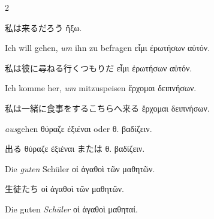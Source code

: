 \begin{paracol}{2}
\begin{enumerate}[leftmargin=0pt,rightmargin=0pt,listparindent =1cm,labelindent=1cm,labelsep=1ex,labelwidth={*},itemindent={*},align=left]
\begin{continuousitemline}
\begin{japanese}
私は来るだろう \textgreek[variant=ancient]{ἥξω.}
\end{japanese}
\switchcolumn*

\begin{german}
Ich will gehen, \emph{um} ihn zu befragen \textgreek[variant=ancient]{εἶμι
ἐρωτήσων αὐτόν.}
\end{german}
\switchcolumn

\begin{japanese}
私は彼に尋ねる行くつもりだ \textgreek[variant=ancient]{εἶμι
ἐρωτήσων αὐτόν.}
\end{japanese}
\switchcolumn*

\begin{german}
Ich komme her, \emph{um} mit\textcompwordmark{}zuspeisen \textgreek[variant=ancient]{ἔρχομαι
δειπνήσων.}
\end{german}
\switchcolumn

\begin{japanese}
私は一緒に食事をするこちらへ来る \textgreek[variant=ancient]{ἔρχομαι
δειπνήσων.}
\end{japanese}
\switchcolumn*

\begin{german}
\emph{aus}gehen \textgreek[variant=ancient]{θύραζε ἐξιέναι} oder
\textgreek[variant=ancient]{θ. βαδίζειν.}
\end{german}
\switchcolumn

\begin{japanese}
出る \textgreek[variant=ancient]{θύραζε ἐξιέναι} または
\textgreek[variant=ancient]{θ. βαδίζειν.}
\end{japanese}
\switchcolumn*
\end{continuousitemline}

\begin{german}
\item Die \emph{guten} Schüler \textgreek[variant=ancient]{οἱ ἀγαθοὶ τῶν
μαθητῶν.}
\end{german}
\switchcolumn

\begin{japanese}
生徒たち \textgreek[variant=ancient]{οἱ ἀγαθοὶ τῶν
μαθητῶν.}
\end{japanese}
\switchcolumn*

\begin{german}
\begin{continuousitemline}Die guten \emph{Schüler} \textgreek[variant=ancient]{οἱ
ἀγαθοὶ μαθηταί.}\par\end{continuousitemline}
\end{german}
\switchcolumn


\end{enumerate}
\end{paracol}
